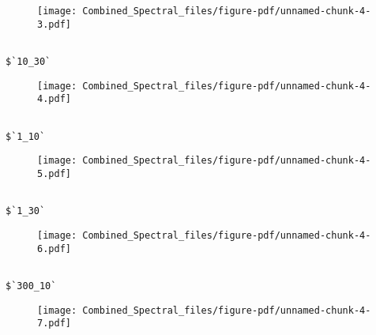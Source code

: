 \documentclass[
  letterpaper,
  DIV=11,
  numbers=noendperiod]{scrartcl}
\begin{document}
\begin{figure}[H]

{\centering \texttt{[image: Combined\_Spectral\_files/figure-pdf/unnamed-chunk-4-3.pdf]}

}

\end{figure}

\begin{verbatim}

$`10_30`
\end{verbatim}

\begin{figure}[H]

{\centering \texttt{[image: Combined\_Spectral\_files/figure-pdf/unnamed-chunk-4-4.pdf]}

}

\end{figure}

\begin{verbatim}

$`1_10`
\end{verbatim}

\begin{figure}[H]

{\centering \texttt{[image: Combined\_Spectral\_files/figure-pdf/unnamed-chunk-4-5.pdf]}

}

\end{figure}

\begin{verbatim}

$`1_30`
\end{verbatim}

\begin{figure}[H]

{\centering \texttt{[image: Combined\_Spectral\_files/figure-pdf/unnamed-chunk-4-6.pdf]}

}

\end{figure}

\begin{verbatim}

$`300_10`
\end{verbatim}

\begin{figure}[H]

{\centering \texttt{[image: Combined\_Spectral\_files/figure-pdf/unnamed-chunk-4-7.pdf]}

}

\end{figure}
\end{document}
